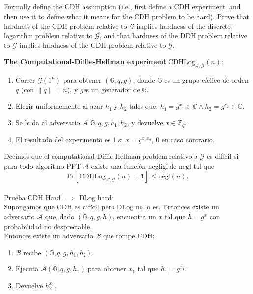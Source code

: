 \documentclass[12pt,addpoints,answers]{exam}
\begin{document}
\begin{questions}
\question[10] Formally define the CDH assumption (i.e., first define a CDH experiment, and then use it to define what it means for the CDH problem to be hard). Prove that hardness of the CDH problem relative to $\mathcal{G}$ implies hardness of the discrete-logarithm problem relative to $\mathcal{G}$, and that hardness of the DDH problem relative to $\mathcal{G}$ implies hardness of the CDH problem relative to $\mathcal{G}$.
\begin{solution}
    \textbf{The Computational-Diffie-Hellman experiment} $\text{CDHLog}_{\mathcal{A},\mathcal{G}}(n)$:
    \begin{enumerate}
        \item Correr $\mathcal{G}(1^n)$ para obtener $(\mathbb{G}, q, g)$, donde $\mathbb{G}$ es un grupo cíclico de orden $q$ (con $\|q\| = n$), y $g$es un generador de $\mathbb{G}$.
        \item Elegir uniformemente al azar $h_1$ y $h_2$ tales que: $h_1 = g^{x_1} \in \mathbb{G} \land h_2 = g^{x_2} \in \mathbb{G}$.
        \item Se le da al adversario $\mathcal{A}$ $\mathbb{G}, q, g, h_1, h_2$, y devuelve $x \in \mathbb{Z}_q$.
        \item El resultado del experimento es 1 si $x = g^{x_1 x_2}$, 0 en caso contrario.
    \end{enumerate}
    Decimos que el computational Diffie-Hellman problem relativo a $\mathcal{G}$ es difícil si para todo algoritmo PPT $\mathcal{A}$ existe una función negligible $\text{negl}$ tal que 
    \[
    \text{Pr}[\text{CDHLog}_{\mathcal{A},\mathcal{G}}(n) = 1] \leq \text{negl}(n).
    \] \\ 
    Prueba CDH Hard $\implies$ DLog hard: \\ 
    Supongamos que CDH es difícil pero DLog no lo es. 
    Entonces existe un adversario $\mathcal{A}$ que, dado $(\mathbb{G}, q, g, h)$, encuentra un $x$ tal que $h = g^x$ con probabilidad no despreciable. \\
    
    Entonces existe un adversario $\mathcal{B}$ que rompe CDH:
    \begin{enumerate}
        \item $\mathcal{B}$ recibe $(\mathbb{G}, q, g, h_1, h_2)$.
        \item Ejecuta $\mathcal{A}(\mathbb{G}, q, g, h_1)$ para obtener $x_1$ tal que $h_1 = g^{x_1}$.
        \item Devuelve $h_2^{x_1}$.
    \end{enumerate}
    

\end{solution}
\end{questions}
\end{document}
